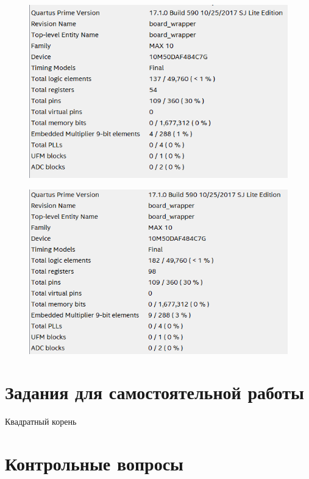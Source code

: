 \documentclass[a4paper,14pt]{article}
\begin{document}
	\begin{figure}[H]
		\centering
		\includegraphics[width=0.8\linewidth]{images/z3_5}
		\caption{}
		\label{fig:z35}
	\end{figure}

	\begin{figure}[H]
		\centering
		\includegraphics[width=0.8\linewidth]{images/z3_10}
		\caption{}
		\label{fig:z310}
	\end{figure}
	

	\section{Задания для самостоятельной работы}
	
	Квадратный корень
	
	
	
	
	
	\section{Контрольные вопросы}
	
\end{document}

